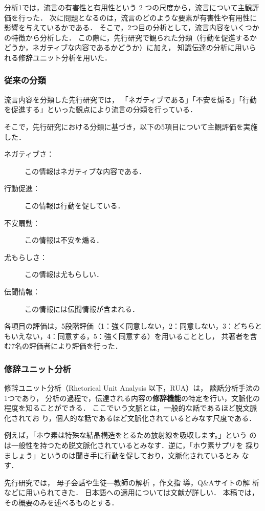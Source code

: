 \documentclass[japanese]{jnlp_1.4}
\begin{document}
分析1では，流言の有害性と有用性という 2 つの尺度から，流言について主観評価を行った．
次に問題となるのは，流言のどのような要素が有害性や有用性に影響を与えているかである．
そこで，2つ目の分析として，流言内容をいくつかの特徴から分析した．
この際に，先行研究で観られた分類（行動を促進するかどうか，ネガティブな内容であるかどうか）に加え，
知識伝達の分析に用いられる修辞ユニット分析を用いた．


\subsubsection{従来の分類}
流言内容を分類した先行研究\cite{Article_Umejima}では，
「ネガティブである」「不安を煽る」「行動を促進する」といった観点により流言の分類を行っている．

そこで，先行研究における分類に基づき，以下の5項目について主観評価を実施した．
\begin{description}
\item[ネガティブさ：] この情報はネガティブな内容である．
\item[行動促進：] この情報は行動を促している．
\item[不安扇動：] この情報は不安を煽る．
\item[尤もらしさ：] この情報は尤もらしい．
\item[伝聞情報：] この情報には伝聞情報が含まれる．
\end{description}

各項目の評価は，5段階評価（1：強く同意しない，2：同意しない，3：どちらともいえない，4：同意する，5：強く同意する）を用いることとし，
共著者を含む7名の評価者により評価を行った．


\subsubsection{修辞ユニット分析}
\label{sec:rua}


修辞ユニット分析（Rhetorical Unit Analysis 以下，RUA）\cite{Cloran99}は，
談話分析手法の1つであり，
分析の過程で，伝達される内容の{\bf 修辞機能}の特定を行い，文脈化の程度を知ることができる．
ここでいう文脈とは，一般的な話であるほど脱文脈化されてお
り，個人的な話であるほど文脈化されているとみなす尺度である．

例えば，「ホウ素は特殊な結晶構造をとるため放射線を吸収します。」という
のは一般性を持つため脱文脈化されているとみなす．逆に，「ホウ素サプリを
採りましょう」というのは聞き手に行動を促しており，文脈化されているとみ
なす．

先行研究では，
母子会話や生徒—教師の解析\cite{Cloran94,Cloran99,Cloran2010} ，作文指
導\cite{Article_Sano}，Q\&Aサイトの解
析
\cite{Inproc_TanakaandSano,Inproc_TanakaandSano2,Inproc_TanakaandSano3,Inproc_Tanaka}
などに用いられてきた．
日本語への適用については文献\cite{Web_Sano,Article_Sano2011}が詳しい．
本稿では，その概要のみを述べるものとする．
\end{document}
